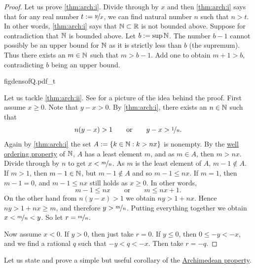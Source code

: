 \begin{proof}
Let us prove \ref{thm:arch:i}.  Divide through by $x$ and then 
\ref{thm:arch:i} says that for any real number $t:= \nicefrac{y}{x}$,
we can find natural number $n$ such that $n > t$.  In other words,
\ref{thm:arch:i} says that ${\mathbb{N}} \subset {\mathbb{R}}$ is not bounded above.
Suppose for contradiction that ${\mathbb{N}}$ is bounded above.  Let $b := \sup {\mathbb{N}}$.
The number $b-1$ cannot possibly be an upper bound for ${\mathbb{N}}$ as it is strictly
less than $b$ (the supremum).  Thus there exists an $m \in {\mathbb{N}}$ such that $m > b-1$.
Add one to obtain $m+1 > b$, contradicting $b$ being an
upper bound.

\begin{myfigureht}
{figdensofQ.pdf_t}
\caption{Idea of the proof of the density of $\Q$: Find $n$ such that $y-x >
\nicefrac{1}{n}$, then take the least $m$ such that $\nicefrac{m}{n} > x$.\label{figdensofQ}}
\end{myfigureht}
Let us tackle \ref{thm:arch:ii}.
See 
for a picture of the idea behind the proof.
First assume $x \geq 0$.
Note that $y-x > 0$.
By \ref{thm:arch:i}, there exists an $n \in {\mathbb{N}}$ such that
\begin{equation*}
n(y-x) > 1
\qquad \text{or} \qquad
y-x > \nicefrac{1}{n}.
\end{equation*}
Again by \ref{thm:arch:i} the set 
$A := \{ k \in {\mathbb{N}} : k > nx \}$ is nonempty.  By the
\hyperlink{wop:link}{well ordering property}
of ${\mathbb{N}}$, $A$ has a least element $m$, and as $m \in A$,
then $m > nx$.
Divide through by $n$ to get $x < \nicefrac{m}{n}$.
As $m$ is the least
element of $A$, $m-1 \notin A$.
If $m > 1$, then $m-1 \in {\mathbb{N}}$, but $m-1 \notin A$ and so $m-1 \leq nx$.
If $m=1$,
then $m-1 = 0$, and $m-1 \leq nx$ still holds as $x \geq 0$.
In other words,
\begin{equation*}
m-1 \leq nx \qquad \text{or} \qquad m \leq nx+1 .
\end{equation*}
On the other hand
from $n(y-x) > 1$ we obtain $ny > 1+nx$.
Hence $ny > 1+nx \geq m$, and therefore $y > \nicefrac{m}{n}$.
Putting everything together we obtain $x < \nicefrac{m}{n} < y$.
So let $r = \nicefrac{m}{n}$.

Now assume $x < 0$.  If $y > 0$, then just take $r=0$.  If
$y \leq 0$, then $0 \leq -y < -x$, and we
find a rational $q$ such that $-y < q < -x$.  Then take $r = -q$.
\end{proof}

Let us state and prove a simple but useful corollary of the
\hyperref[thm:arch:i]{Archimedean property}.

